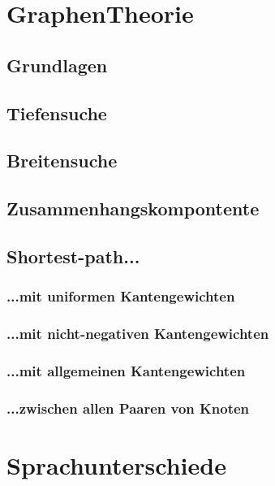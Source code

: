 \documentclass[a4paper]{article}
\begin{document}
\section{GraphenTheorie}

\subsection{Grundlagen}

\subsection{Tiefensuche}

\subsection{Breitensuche}

\subsection{Zusammenhangskompontente}

\subsection{Shortest-path...}

\subsubsection{...mit uniformen Kantengewichten}

\subsubsection{...mit nicht-negativen Kantengewichten}

\subsubsection{...mit allgemeinen Kantengewichten}

\subsubsection{...zwischen allen Paaren von Knoten}



\section{Sprachunterschiede}
\end{document}
